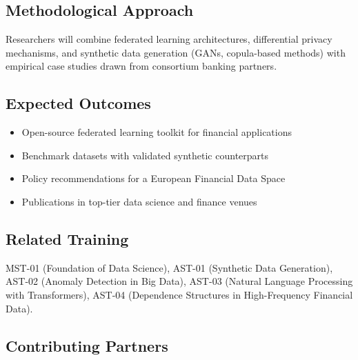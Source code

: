 \subsection*{Methodological Approach}

Researchers will combine federated learning architectures, differential privacy
mechanisms, and synthetic data generation (GANs, copula-based methods) with
empirical case studies drawn from consortium banking partners.

\subsection*{Expected Outcomes}
\begin{itemize}[nosep]
  \item Open-source federated learning toolkit for financial applications
  \item Benchmark datasets with validated synthetic counterparts
  \item Policy recommendations for a European Financial Data Space
  \item Publications in top-tier data science and finance venues
\end{itemize}

\subsection*{Related Training}
MST-01 (Foundation of Data Science), AST-01 (Synthetic Data Generation),
AST-02 (Anomaly Detection in Big Data), AST-03 (Natural Language Processing with Transformers),
AST-04 (Dependence Structures in High-Frequency Financial Data).

\subsection*{Contributing Partners}
\begin{center}
\hspace{3mm}%
\hspace{3mm}%
\hspace{3mm}%
\end{center}

\newpage



